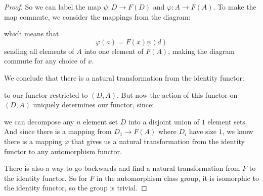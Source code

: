 \documentclass{article}
\begin{document}
    \begin{proof}
        So we can label the map $\psi: D \rightarrow F(D)$ and $\varphi: A \rightarrow F(A)$. To make the map commute, we consider the mappings from the diagram:
            \begin{center}
            \end{center}
        which means that 
            \begin{equation*}
                \varphi(a) = F(x)\psi(d)
            \end{equation*}
        sending all elements of $A$ into one element of $F(A)$, making the diagram commute for any choice of $x$.

        We conclude that there is a natural transformation from the identity functor:
            \begin{center}
            \end{center}
        to our functor restricted to $(D, A)$. But now the action of this functor on $(D, A)$ uniquely determines our functor, since:
            \begin{center}
            \end{center}
        we can decompose any $n$ element set $D$ into a disjoint union of $1$ element sets. And since there is a mapping from $D_{1} \rightarrow F(A)$ where $D_{i}$ have size $1$, we know there is a mapping $\varphi$ that gives us a natural transformation from the identity functor to any automorphism functor.

        There is also a way to go backwards and find a natural transformation from $F$ to the identity functor. So for $F$ in the automorphism class group, it is isomorphic to the identity functor, so the group is trivial.
    \end{proof}
\end{document}
